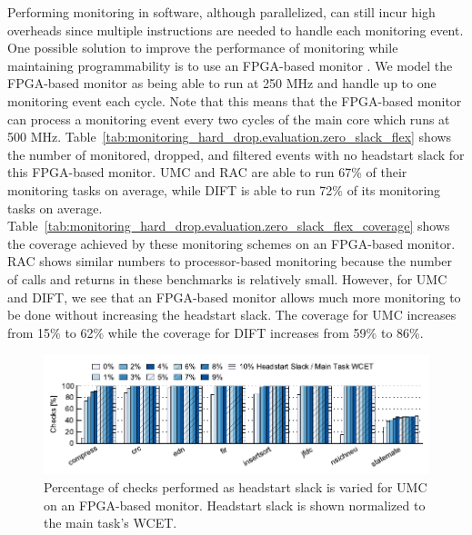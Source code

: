 Performing monitoring in software, although parallelized, can still incur high
overheads since multiple instructions are needed to handle each monitoring
event. One possible solution to improve the performance of monitoring while
maintaining programmability is to use an FPGA-based monitor
\cite{deng-flexcore-micro10}. We model the FPGA-based monitor as being able to
run at 250 MHz and handle up to one monitoring event each cycle. Note that this
means that the FPGA-based monitor can process a monitoring event every two
cycles of the main core which runs at 500 MHz.
Table~\ref{tab:monitoring_hard_drop.evaluation.zero_slack_flex} shows the
number of monitored, dropped, and filtered events with no headstart slack for
this FPGA-based monitor. UMC and RAC are able to run 67\% of their monitoring
tasks on average, while DIFT is able to run 72\% of its monitoring tasks on
average.
Table~\ref{tab:monitoring_hard_drop.evaluation.zero_slack_flex_coverage} shows
the coverage achieved by these monitoring schemes on an FPGA-based monitor. RAC
shows similar numbers to processor-based monitoring because the number of calls
and returns in these benchmarks is relatively small. However, for UMC and DIFT,
we see that an FPGA-based monitor allows much more monitoring to be done
without increasing the headstart slack. The coverage for UMC increases from
15\% to 62\% while the coverage for DIFT increases from 59\% to 86\%.

\begin{figure}
  \begin{center}
    \includegraphics{monitoring_hard_drop/data/flex_umc_sweep.pdf}
    \caption{Percentage of checks performed as headstart slack is varied for
    UMC on an FPGA-based monitor. Headstart slack is shown normalized to the
    main task's WCET.}
    \label{fig:monitoring_hard_drop.evaluation.flex_umc_sweep}
  \end{center}
\end{figure}

